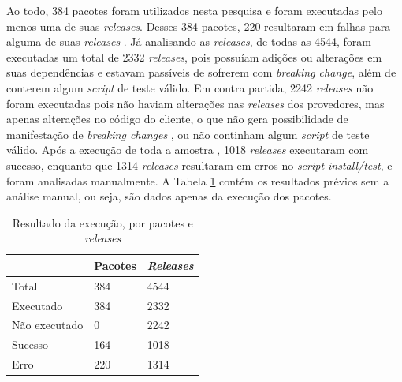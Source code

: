 Ao todo, 384 pacotes foram utilizados nesta pesquisa e foram executadas pelo menos uma de suas \textit{releases}.  Desses 384 pacotes, 220 resultaram em falhas para alguma de suas \textit{releases} . Já analisando as \textit{releases}, de todas as 4544, foram executadas um total de 2332 \textit{releases}, pois possuíam adições ou alterações em suas dependências e estavam passíveis de sofrerem com \textit{breaking change}, além de conterem algum \textit{script} de teste válido.  Em contra partida, 2242 \textit{releases} não foram executadas pois não haviam alterações nas \textit{releases} dos provedores, mas apenas alterações no código do cliente, o que não gera possibilidade de manifestação de \textit{breaking changes} , ou não continham algum \textit{script} de teste válido. Após a execução de toda a amostra , 1018 \textit{releases} executaram com sucesso, enquanto que 1314 \textit{releases} resultaram em erros no \textit{script install/test}, e foram analisadas manualmente. A Tabela \ref{tab:res_rq1_1} contém os resultados prévios sem a análise manual, ou seja, são dados apenas da execução dos pacotes. 

\begin{table}[]
\centering
\begin{tabular}{|l|l|l|}
\hline
                    & Pacotes & \textit{Releases} \\ \hline
    Total           & 384     & 4544     \\
    Executado       & 384     & 2332     \\
    Não executado   & 0       & 2242     \\
    Sucesso         & 164     & 1018     \\
    Erro            & 220     & 1314     \\ \hline
\end{tabular}
\caption{Resultado da execução, por pacotes e \textit{releases}}
\label{tab:res_rq1_1}
\end{table}

